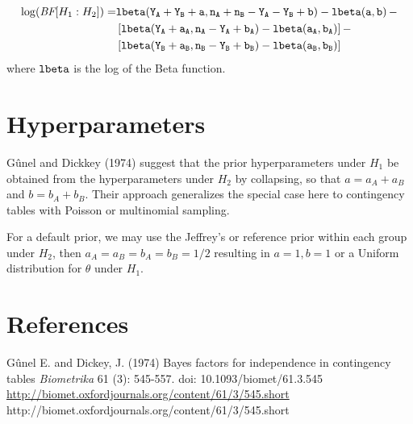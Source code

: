 \documentclass[11pt]{article}
\def\lbeta{\tt{lbeta}}
\def\BF{\textit{BF}}
\begin{document}
\begin{align*}
\log(\BF[H_1: H_2]) =  & \lbeta(Y_A + Y_B + a, n_A + n_B - Y_A - Y_B + b) - \lbeta(a,b) \, - \\
 & \left[ \lbeta(Y_A + a_A, n_A - Y_A  + b_A) - \lbeta(a_A,b_A) \right] - \\
 & \left[\lbeta(Y_B + a_B, n_B - Y_B  + b_B) - \lbeta(a_B,b_B) \right]
\end{align*} 
where $\lbeta$ is the log of the Beta function.

\section*{Hyperparameters}

G\^unel and Dickkey (1974) suggest that the prior hyperparameters under $H_1$ be obtained from the hyperparameters under $H_2$ by collapsing, so that $a = a_A + a_B$ and $b = b_A + b_B$.   Their approach generalizes the special case here to contingency tables with Poisson or multinomial sampling.

For a default prior, we may use the Jeffrey's or reference prior within each group under $H_2$, then $a_A = a_B = b_A = b_B = 1/2$ resulting in $a = 1, b=1$ or a Uniform distribution for $\theta$ under $H_1$. 

\section*{References}
G\^unel E. and Dickey, J. (1974) Bayes factors for independence in contingency tables
{\it Biometrika}  61 (3): 545-557.
doi: 10.1093/biomet/61.3.545 \url{http://biomet.oxfordjournals.org/content/61/3/545.short}
http://biomet.oxfordjournals.org/content/61/3/545.short
\end{document}

